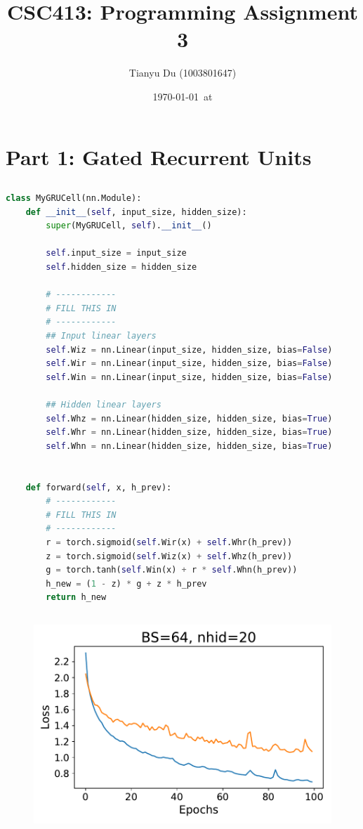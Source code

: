 \documentclass{article}
\title{CSC413: Programming Assignment 3}
\date{\today\ at \currenttime}
\author{Tianyu Du (1003801647)}
\begin{document}
	\maketitle
	\section{Part 1: Gated Recurrent Units}
	\subsection{}
\begin{lstlisting}[language=python]
class MyGRUCell(nn.Module):
    def __init__(self, input_size, hidden_size):
        super(MyGRUCell, self).__init__()

        self.input_size = input_size
        self.hidden_size = hidden_size

        # ------------
        # FILL THIS IN
        # ------------
        ## Input linear layers
        self.Wiz = nn.Linear(input_size, hidden_size, bias=False)
        self.Wir = nn.Linear(input_size, hidden_size, bias=False)
        self.Win = nn.Linear(input_size, hidden_size, bias=False)

        ## Hidden linear layers
        self.Whz = nn.Linear(hidden_size, hidden_size, bias=True)
        self.Whr = nn.Linear(hidden_size, hidden_size, bias=True)
        self.Whn = nn.Linear(hidden_size, hidden_size, bias=True)
        

    def forward(self, x, h_prev):
        # ------------
        # FILL THIS IN
        # ------------
        r = torch.sigmoid(self.Wir(x) + self.Whr(h_prev))
        z = torch.sigmoid(self.Wiz(x) + self.Whz(h_prev))
        g = torch.tanh(self.Win(x) + r * self.Whn(h_prev))
        h_new = (1 - z) * g + z * h_prev
        return h_new
\end{lstlisting}
	\subsection{}
	\begin{figure}[H]
		\centering
		\includegraphics[width=0.7\linewidth]{GRU_loss_plot.pdf}
	\end{figure}
\end{document}
